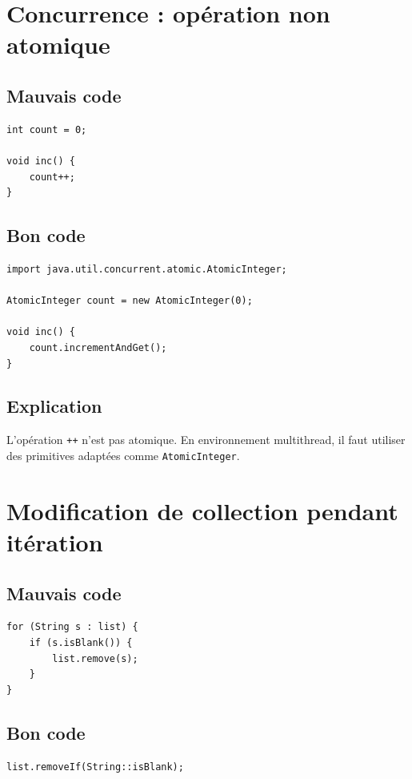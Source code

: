 \documentclass[a4paper,11pt]{report}
\begin{document}
\chapter{Concurrence : opération non atomique}

\section{Mauvais code}
\begin{lstlisting}
int count = 0;

void inc() {
    count++;
}
\end{lstlisting}

\section{Bon code}
\begin{lstlisting}
import java.util.concurrent.atomic.AtomicInteger;

AtomicInteger count = new AtomicInteger(0);

void inc() {
    count.incrementAndGet();
}
\end{lstlisting}

\section{Explication}
L'opération \texttt{++} n'est pas atomique.
En environnement multithread, il faut utiliser des primitives adaptées comme \texttt{AtomicInteger}.

\chapter{Modification de collection pendant itération}

\section{Mauvais code}
\begin{lstlisting}
for (String s : list) {
    if (s.isBlank()) {
        list.remove(s);
    }
}
\end{lstlisting}

\section{Bon code}
\begin{lstlisting}
list.removeIf(String::isBlank);
\end{lstlisting}
\end{document}
